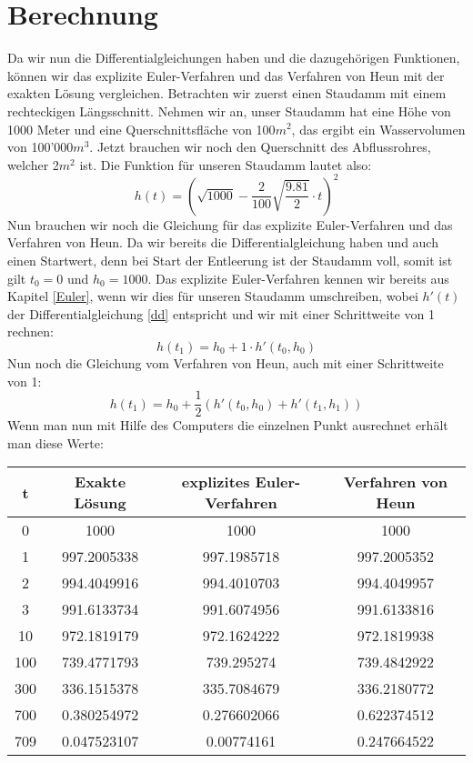 \documentclass[a4paper,12pt]{report}
\begin{document}
\section{Berechnung}
Da wir nun die Differentialgleichungen haben und die dazugehörigen Funktionen, können wir das explizite Euler-Verfahren und das Verfahren von Heun mit der exakten Lösung vergleichen. Betrachten wir zuerst einen Staudamm mit einem rechteckigen Längsschnitt. Nehmen wir an, unser Staudamm hat eine Höhe von 1000 Meter und eine Querschnittsfläche von 100$m^2$, das ergibt ein Wasservolumen von 100'000$m^3$. Jetzt brauchen wir noch den Querschnitt des Abflussrohres, welcher 2$m^2$ ist. Die Funktion für unseren Staudamm lautet also:
\begin{equation}
h(t) = \left( \sqrt{1000} - \frac{2}{100} \sqrt{\frac{9.81}{2}} \cdot t \right)^2
\end{equation}
Nun brauchen wir noch die Gleichung für das explizite Euler-Verfahren und das Verfahren von Heun. Da wir bereits die Differentialgleichung haben und auch einen Startwert, denn bei Start der Entleerung ist der Staudamm voll, somit ist gilt $t_0 = 0$ und $h_0 = 1000$. Das explizite Euler-Verfahren kennen wir bereits aus Kapitel \ref{Euler}, wenn wir dies für unseren Staudamm umschreiben, wobei $h'(t)$ der Differentialgleichung \ref{dd} entspricht und wir mit einer Schrittweite von 1 rechnen:
\begin{equation}
h(t_1) = h_0 + 1 \cdot h'(t_0, h_0)
\end{equation}
Nun noch die Gleichung vom Verfahren von Heun, auch mit einer Schrittweite von 1: 
\begin{equation}
h(t_1) = h_0 + \frac{1}{2} (h'(t_0, h_0) + h'(t_1, h_1))
\end{equation}
Wenn man nun mit Hilfe des Computers die einzelnen Punkt ausrechnet erhält man diese Werte: \\

\begin{center}
\begin{tabular}[h]{c|c|c|c}
t & Exakte Lösung & explizites Euler-Verfahren & Verfahren von Heun \\
\hline
0 & 1000 & 1000 & 1000 \\
\hline
1 & 997.2005338 & 997.1985718 & 997.2005352 \\
\hline
2 & 994.4049916 & 994.4010703 & 994.4049957 \\
\hline
3 & 991.6133734 & 991.6074956 & 991.6133816 \\
\hline
10 & 972.1819179 & 972.1624222 & 972.1819938 \\
\hline
100 & 739.4771793 & 739.295274 & 739.4842922 \\
\hline
300 &336.1515378 & 335.7084679 & 336.2180772 \\
\hline
700 & 0.380254972 & 0.276602066 & 0.622374512 \\
\hline
709 & 0.047523107 & 0.00774161 & 0.247664522 \\

\end{tabular}
\end{center}
\end{document}
